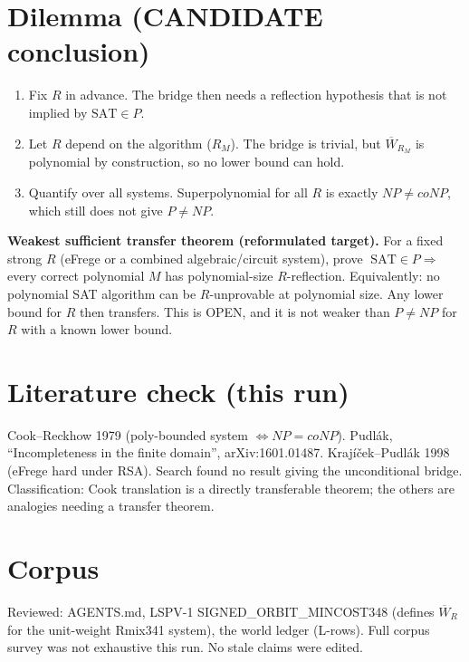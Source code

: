 \documentclass{article}
\begin{document}
\section*{Dilemma (CANDIDATE conclusion)}
\begin{enumerate}
\item Fix $R$ in advance. The bridge then needs a reflection hypothesis that is not implied by $\mathrm{SAT}\in P$.
\item Let $R$ depend on the algorithm ($R_M$). The bridge is trivial, but $\overline W_{R_M}$ is polynomial by construction, so no lower bound can hold.
\item Quantify over all systems. Superpolynomial for all $R$ is exactly $NP\neq coNP$, which still does not give $P\neq NP$.
\end{enumerate}
\textbf{Weakest sufficient transfer theorem (reformulated target).} For a fixed strong $R$ (eFrege or a combined algebraic/circuit system), prove
$\;\mathrm{SAT}\in P\Rightarrow$ every correct polynomial $M$ has polynomial-size $R$-reflection.
Equivalently: no polynomial SAT algorithm can be $R$-unprovable at polynomial size. Any lower bound for $R$ then transfers. This is OPEN, and it is not weaker than $P\ne NP$ for $R$ with a known lower bound.

\section*{Literature check (this run)}
Cook--Reckhow 1979 (poly-bounded system $\iff NP=coNP$). Pudl\'ak, ``Incompleteness in the finite domain'', arXiv:1601.01487. Kraj\'i\v cek--Pudl\'ak 1998 (eFrege hard under RSA). Search found no result giving the unconditional bridge. Classification: Cook translation is a directly transferable theorem; the others are analogies needing a transfer theorem.

\section*{Corpus}
Reviewed: AGENTS.md, LSPV-1 SIGNED\_ORBIT\_MINCOST348 (defines $\overline W_R$ for the unit-weight Rmix341 system), the world ledger (L-rows). Full corpus survey was not exhaustive this run. No stale claims were edited.

\end{document}
